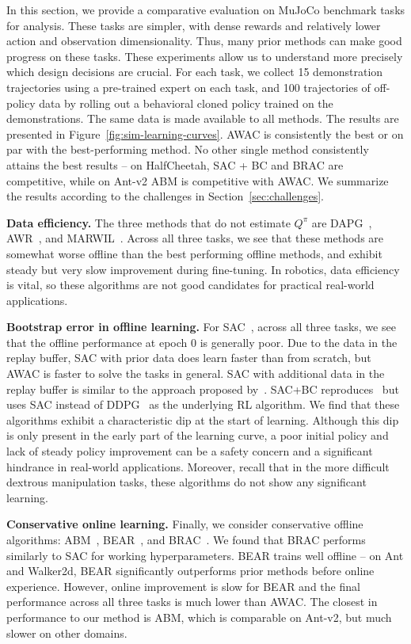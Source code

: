 \documentclass[conference]{IEEEtran}
\begin{document}
In this section, we provide a comparative evaluation on MuJoCo benchmark tasks for analysis. These tasks are simpler, with dense rewards and relatively lower action and observation dimensionality. Thus, many prior methods can make good progress on these tasks. These experiments allow us to understand more precisely which design decisions are crucial. For each task, we collect 15 demonstration trajectories using a pre-trained expert on each task, and 100 trajectories of off-policy data by rolling out a behavioral cloned policy trained on the demonstrations. The same data is made available to all methods. The results are presented in Figure~\ref{fig:sim-learning-curves}. AWAC is consistently the best or on par with the best-performing method. No other single method consistently attains the best results -- on HalfCheetah, SAC + BC and BRAC are competitive, while on Ant-v2 ABM is competitive with AWAC.
We summarize the results according to the challenges in Section~\ref{sec:challenges}.

\textbf{Data efficiency.} The three methods that do not estimate $Q^\pi$ are DAPG~\citep{rajeswaran2018dextrous}, AWR~\citep{peng2019awr}, and MARWIL~\citep{wang2018marwil}. Across all three tasks, we see that these methods are somewhat worse offline than the best performing offline methods, and exhibit steady but very slow improvement during fine-tuning. In robotics, data efficiency is vital, so these algorithms are not good candidates for practical real-world applications.

\textbf{Bootstrap error in offline learning.} For SAC~\citep{haarnoja2018sac}, across all three tasks, we see that the offline performance at epoch 0 is generally poor. Due to the data in the replay buffer, SAC with prior data does learn faster than from scratch, but AWAC is faster to solve the tasks in general. SAC with additional data in the replay buffer is similar to the approach proposed by~\citet{vecerik17ddpgfd}. SAC+BC reproduces~\citet{nair2018demonstrations} but uses SAC instead of DDPG~\citep{lillicrap2015continuous} as the underlying RL algorithm. We find that these algorithms exhibit a characteristic dip at the start of learning. Although this dip is only present in the early part of the learning curve, a poor initial policy and lack of steady policy improvement can be a safety concern and a significant hindrance in real-world applications. Moreover, recall that in the more difficult dextrous manipulation tasks, these algorithms do not show any significant learning.

\textbf{Conservative online learning.} Finally, we consider  conservative offline algorithms: ABM~\citep{siegel2020abm}, BEAR~\citep{kumar19bear}, and BRAC~\citep{wu2019brac}. We found that BRAC performs similarly to SAC for working hyperparameters. BEAR trains well offline -- on Ant and Walker2d, BEAR significantly outperforms prior methods before online experience. However, online improvement is slow for BEAR and the final performance across all three tasks is much lower than AWAC. The closest in performance to our method is ABM, which is comparable on Ant-v2, but much slower on other domains. 
\end{document}
